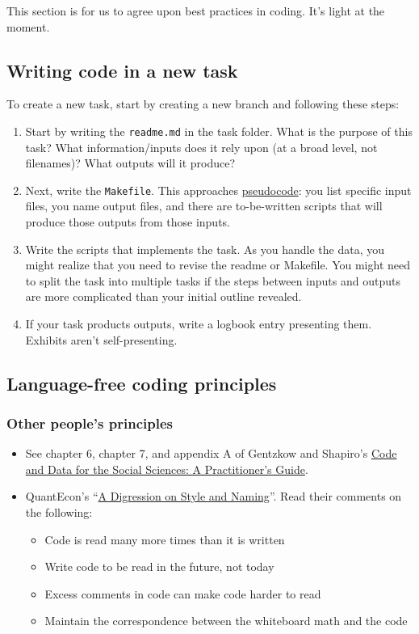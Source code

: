 \label{sec:writing-code}
This section is for us to agree upon best practices in coding.
It's light at the moment.

\subsection{Writing code in a new task}

To create a new task, start by creating a new branch and following these steps:
\begin{enumerate}
\item
Start by writing the \texttt{readme.md} in the task folder.
What is the purpose of this task?
What information/inputs does it rely upon (at a broad level, not filenames)?
What outputs will it produce?
\item
Next, write the \texttt{Makefile}.
This approaches \href{https://en.wikipedia.org/wiki/Pseudocode}{pseudocode}: you list specific input files, you name output files, and there are to-be-written scripts that will produce those outputs from those inputs.
\item
Write the scripts that implements the task.
As you handle the data, you might realize that you need to revise the readme or Makefile.
You might need to split the task into multiple tasks if the steps between inputs and outputs are more complicated than your initial outline revealed.
\item
If your task products outputs, write a logbook entry presenting them.
Exhibits aren't self-presenting.
\end{enumerate}

\subsection{Language-free coding principles}

\subsubsection{Other people's principles}

\begin{itemize}
	\item See chapter 6, chapter 7, and appendix A of Gentzkow and Shapiro's \href{https://web.stanford.edu/~gentzkow/research/CodeAndData.pdf}{Code and Data for the Social Sciences: A Practitioner’s Guide}.
	\item QuantEcon's ``\href{https://julia.quantecon.org/getting_started_julia/introduction_to_types.html#A-Digression-on-Style-and-Naming}{A Digression on Style and Naming}''. Read their comments on the following:
	\begin{itemize}
	\item Code is read many more times than it is written
	\item Write code to be read in the future, not today
	\item Excess comments in code can make code harder to read
	\item Maintain the correspondence between the whiteboard math and the code
	\end{itemize}
\end{itemize}

